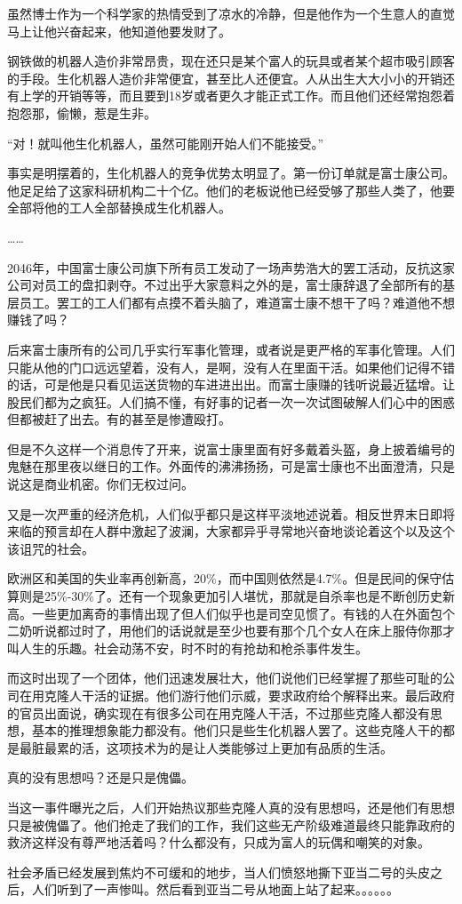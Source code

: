 \documentclass[11pt,oneside]{article}
\begin{document}
虽然博士作为一个科学家的热情受到了凉水的冷静，但是他作为一个生意人的直觉马上让他兴奋起来，他知道他要发财了。

钢铁做的机器人造价非常昂贵，现在还只是某个富人的玩具或者某个超市吸引顾客的手段。生化机器人造价非常便宜，甚至比人还便宜。人从出生大大小小的开销还有上学的开销等等，而且要到18岁或者更久才能正式工作。而且他们还经常抱怨着抱怨那，偷懒，惹是生非。

“对！就叫他生化机器人，虽然可能刚开始人们不能接受。”

事实是明摆着的，生化机器人的竞争优势太明显了。第一份订单就是富士康公司。他足足给了这家科研机构二十个亿。他们的老板说他已经受够了那些人类了，他要全部将他的工人全部替换成生化机器人。

\ldots{}\ldots{}


2046年，中国富士康公司旗下所有员工发动了一场声势浩大的罢工活动，反抗这家公司对员工的盘扣剥夺。不过出乎大家意料之外的是，富士康辞退了全部所有的基层员工。罢工的工人们都有点摸不着头脑了，难道富士康不想干了吗？难道他不想赚钱了吗？

后来富士康所有的公司几乎实行军事化管理，或者说是更严格的军事化管理。人们只能从他的门口远远望着，没有人，是啊，没有人在里面干活。如果他们记得不错的话，可是他是只看见运送货物的车进进出出。而富士康赚的钱听说最近猛增。让股民们都为之疯狂。人们搞不懂，有好事的记者一次一次试图破解人们心中的困惑但都被赶了出去。有的甚至是惨遭殴打。

但是不久这样一个消息传了开来，说富士康里面有好多戴着头盔，身上披着编号的鬼魅在那里夜以继日的工作。外面传的沸沸扬扬，可是富士康也不出面澄清，只是说这是商业机密。你们无权过问。

又是一次严重的经济危机，人们似乎都只是这样平淡地述说着。相反世界末日即将来临的预言却在人群中激起了波澜，大家都异乎寻常地兴奋地谈论着这个以及这个该诅咒的社会。

欧洲区和美国的失业率再创新高，20\%，而中国则依然是4.7\%。但是民间的保守估算则是25\%-30\%了。还有一个现象更加引人堪忧，那就是自杀率也是不断创历史新高。一些更加离奇的事情出现了但人们似乎也是司空见惯了。有钱的人在外面包个二奶听说都过时了，用他们的话说就是至少也要有那个几个女人在床上服侍你那才叫人生的乐趣。社会动荡不安，时不时的有抢劫和枪杀事件发生。

而这时出现了一个团体，他们迅速发展壮大，他们说他们已经掌握了那些可耻的公司在用克隆人干活的证据。他们游行他们示威，要求政府给个解释出来。最后政府的官员出面说，确实现在有很多公司在用克隆人干活，不过那些克隆人都没有思想，基本的推理想象能力都没有。他们只是些生化机器人罢了。这些克隆人干的都是最脏最累的活，这项技术为的是让人类能够过上更加有品质的生活。

真的没有思想吗？还是只是傀儡。

当这一事件曝光之后，人们开始热议那些克隆人真的没有思想吗，还是他们有思想只是被傀儡了。他们抢走了我们的工作，我们这些无产阶级难道最终只能靠政府的救济这样没有尊严地活着吗？什么都没有，只成为富人的玩偶和嘲笑的对象。

社会矛盾已经发展到焦灼不可缓和的地步，当人们愤怒地撕下亚当二号的头皮之后，人们听到了一声惨叫。然后看到亚当二号从地面上站了起来。。。。。。
\end{document}
